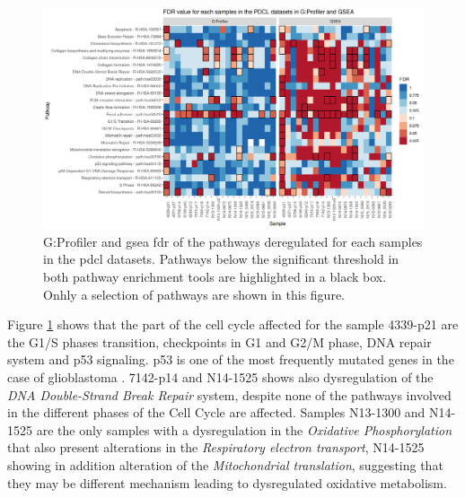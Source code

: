 \begin{figure}
    \includegraphics[width=\textwidth]{img/heatmap-fdr-pathway}
    \caption{
        G:Profiler and \acrshort{gsea} \acrfull{fdr} of the pathways deregulated for each samples in the \acrshort{pdcl} datasets.
        Pathways below the significant threshold in both pathway enrichment tools are highlighted in a black box.
        Onhly a selection of pathways are shown in this figure.
    }
    \label{fig:heatmap-fdr-pathway}
\end{figure}

Figure \ref*{fig:heatmap-fdr-pathway} shows that the part of the cell cycle affected for the sample 4339-p21 are the G1/S phases transition, checkpoints in G1 and G2/M phase, DNA repair system and p53 signaling.
p53 is one of the most frequently mutated genes in the case of glioblastoma \cite*{McLendon2008}.
7142-p14 and N14-1525 shows also dysregulation of the \textit{DNA Double-Strand Break Repair} system, despite none of the pathways involved in the different phases of the Cell Cycle are affected.
Samples N13-1300 and N14-1525 are the only samples with a dysregulation in the \textit{Oxidative Phosphorylation} that also present alterations in the \textit{Respiratory electron transport}, N14-1525 showing in addition alteration of the \textit{Mitochondrial translation}, suggesting that they may be different mechanism leading to dysregulated oxidative metabolism.
